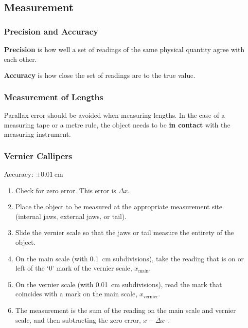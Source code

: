 \documentclass[../main.tex]{subfiles}
\begin{document}
		\subsection{Measurement}
		\subsubsection{Precision and Accuracy}
		
		\textbf{Precision} is how well a set of readings of the same physical quantity agree with each other.
		
		\textbf{Accuracy} is how close the set of readings are to the true value.
		
		\subsubsection{Measurement of Lengths}
		Parallax error should be avoided when measuring lengths. In the case of a measuring tape or a metre rule, the object needs to be \textbf{in contact} with the measuring instrument.
		
		\subsubsection*{Vernier Callipers}
		Accuracy: \(\pm \SI{0.01}{\centi\meter}\)
		\begin{enumerate}
			\item Check for zero error. This error is \(\Delta x\).
			\item Place the object to be measured at the appropriate measurement site (internal jaws, external jaws, or tail).
			\item Slide the vernier scale so that the jaws or tail measure the entirety of the object.
			\item On the main scale (with \SI{0.1}{\centi\meter} subdivisions), take the reading that is on or left of the `0' mark of the vernier scale, \(x_\mathrm{main}\).
			\item On the vernier scale (with \SI{0.01}{\centi\meter} subdivisions), read the mark that coincides with a mark on the main scale, \(x_\mathrm{vernier}\).
			\item The measurement is the sum of the reading on the main scale and vernier scale, and then subtracting the zero error, \(x-\Delta x\) .
		\end{enumerate}
	
\end{document}
